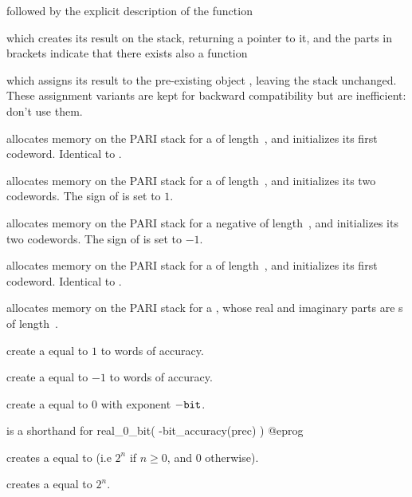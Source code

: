 followed by the explicit
description of the function


\noindent which creates its result on the stack, returning a  pointer
to it, and the parts in brackets indicate that there exists also a function


\noindent which assigns its result to the pre-existing object
, leaving the stack unchanged. These assignment variants are kept for
backward compatibility but are inefficient: don't use them.


 allocates memory on the PARI stack for a 
of length~, and initializes its first codeword. Identical to
.

 allocates memory on the PARI stack for a
 of length~, and initializes its two codewords. The sign
of  is set to $1$.

 allocates memory on the PARI stack for a negative
 of length~, and initializes its two codewords. The sign
of  is set to $-1$.

 allocates memory on the PARI stack for a 
of length~, and initializes its first codeword. Identical to
.

 allocates memory on the PARI stack for a
, whose real and imaginary parts are s
of length~.

 create a  equal to $1$ to 
words of accuracy.

 create a  equal to $-1$ to 
words of accuracy.

 create a  equal to $0$ with
exponent $-{\tt bit}$.

 is a shorthand for
\bprog
  real_0_bit( -bit_accuracy(prec) )
@eprog

 creates a  equal to  (i.e
$2^n$ if $n \geq 0$, and $0$ otherwise).

 creates a  equal to $2^n$.

